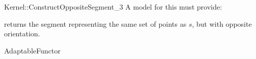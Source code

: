 \begin{ccRefFunctionObjectConcept}{Kernel::ConstructOppositeSegment_3}
A model for this must provide:


{returns the segment representing the same set of points as $s$,
but with opposite orientation.}

\ccRefines
AdaptableFunctor

\ccSeeAlso
{} \\

\end{ccRefFunctionObjectConcept}
